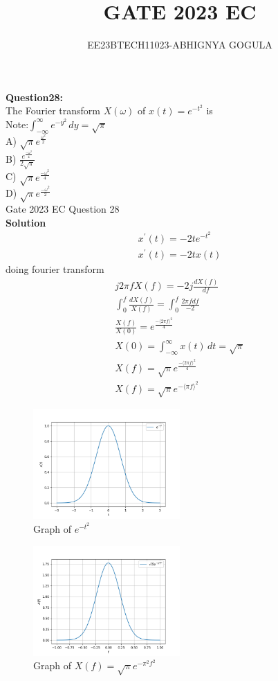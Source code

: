 \documentclass[journal,12pt,twocolumn]{IEEEtran}
\newcommand{\brak}[1]{\langle #1 \rangle}
\theoremstyle{remark}
\begin{document}

\vspace{3cm}
\title{\textbf{GATE 2023 EC}}
\author{EE23BTECH11023-ABHIGNYA GOGULA}
\maketitle
\newpage
\bigskip
\renewcommand{\thefigure}{\theenumi}
\renewcommand{\thetable}{\theenumi}
\textbf{Question28:}
\\
 The Fourier transform $X(\omega)$ of $x(t) = e^{-t^2}$ is\\
Note:$\int_{-\infty}^{\infty} e^{-y^2} \,dy = \sqrt{\pi}$ \\  
A) $\sqrt{\pi} e^{\frac{\omega^2}{2}}$ \\
B) $\frac{e^{\frac{-\omega^2}{4}}}{2\sqrt{\pi}}$ \\
C) $\sqrt{\pi} e^{\frac{-\omega^2}{4}}$ \\
D) $\sqrt{\pi} e^{\frac{-\omega^2}{2}}$\\
\hfill Gate 2023 EC Question 28\\
\textbf{Solution}
\begin{align}
x^{'}(t)=-2te^{-t^{2}}\\
x^{'}(t)=-2tx(t)
\end{align}
doing fourier transform 
\begin{align}
j 2 \pi f X(f)= -2j\frac{d X(f)}{df}\\
\int_{0}^{f} \frac{d X(f)}{X(f)}=\int_{0}^{f} \frac{2 \pi f df}{-2}\\
\frac{X(f)}{X(0)}=e^{\frac{-\brak {2 \pi f}^{2}}{4}}\\
X(0)=\int_{-\infty}^{\infty} x(t)\,dt = \sqrt{\pi}\\
X(f)=\sqrt{\pi}e^{\frac{-\brak {2 \pi f}^2}{4}}\\
X(f)=\sqrt{\pi}e^{-\brak{\pi f}^2}
\end{align}
\begin{figure}[h]
    \centering
    \includegraphics[width=0.5\textwidth]{figs/graph.png}
    \caption{Graph of $e^{-t^2}$}
    \label{fig:plot}
\end{figure}
\begin{figure}[h]
    \centering
    \includegraphics[width=0.5\textwidth]{figs/graph1.png}
    \caption{Graph of $X(f) = \sqrt{\pi}e^{-\pi^2f^2}$}
    \label{fig:plot}
\end{figure}
\end{document}
